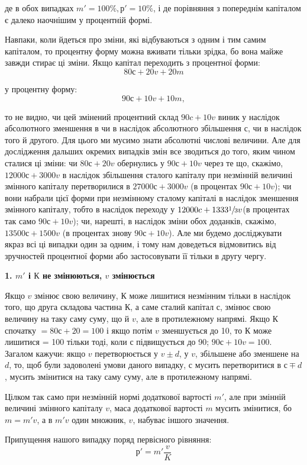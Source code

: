 \parcont{}  %
де в обох випадках $m' = 100\%, р' = 10\%$, і де порівняння з попереднім
капіталом є далеко наочнішим у процентній формі.

Навпаки, коли йдеться про зміни, які відбуваються з одним
і тим самим капіталом, то процентну форму можна вживати
тільки зрідка, бо вона майже завжди стирає ці зміни. Якщо
капітал переходить з процентної форми:\[
80с + 20v + 20m\]

у процентну форму:\[
90с + 10v + 10m,\]

то не видно, чи цей змінений процентний склад $90c + 10v$ виник
у наслідок абсолютного зменшення в чи в наслідок абсолютного
збільшення $с$, чи в наслідок того й другого. Для цього ми мусимо
знати абсолютні числові величини. Але для дослідження
дальших окремих випадків змін все зводиться до того, яким
чином сталися ці зміни: чи $80с + 20v$ обернулись у $90с + 10v$
через те що, скажімо, $12000с + 3000v$ в наслідок збільшення
сталого капіталу при незмінній величині змінного капіталу перетворилися
в $27000с + 3000v$ (в процентах $90с + 10v$); чи вони
набрали цієї форми при незмінному сталому капіталі в наслідок
зменшення змінного капіталу, тобто в наслідок переходу у
$12000c + 1333\sfrac{1}{3}v$(в процентах так само $90с + 10v$); чи, нарешті,
в наслідок зміни обох доданків, скажімо, $13500с + 1500v$
(в процентах знову $90с + 10v$). Але ми будемо досліджувати
якраз всі ці випадки один за одним, і тому нам доведеться
відмовитись від зручностей процентної форми або застосовувати
її тільки в другу чергу.
\begin{center}
  \textbf{1. $m'$ і $К$ не змінюються, $v$ змінюється}
\end{center}
Якщо $v$ змінює свою величину, $К$ може лишитися незмінним
тільки в наслідок того, що друга складова частина $К$, а саме
сталий капітал $с$, змінює свою величину на таку саму суму, що й $v$,
але в протилежному напрямі. Якщо $К$ спочатку $= 80с + 20 = 100$
і якщо потім $v$ зменшується до 10, то $К$ може лишитися = 100
тільки тоді, коли $с$ підвищується до 90; $90с + 10v = 100$. Загалом
кажучи: якщо $v$ перетворюється у $v \pm d$, у $v$, збільшене або
зменшене на $d$, то, щоб були задоволені умови даного випадку,
$с$ мусить перетворитися в $с \mp d$, мусить змінитися на таку саму
суму, але в протилежному напрямі.

Цілком так само при незмінній нормі додаткової вартості $m'$,
але при змінній величині змінного капіталу $v$, маса додаткової
вартості $m$ мусить змінитися, бо $m = m'v$, а в $m'v$ один множник,
$v$, набуває іншого значення.

Припущення нашого випадку поряд первісного рівняння:\[
р' = m'\frac{v}{K}\]

\parbreak{}  %

